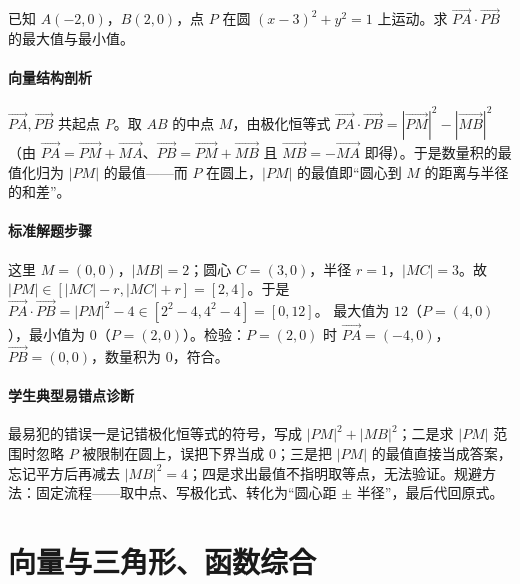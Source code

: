 \begin{problem}
已知 $A(-2,0)$，$B(2,0)$，点 $P$ 在圆 $(x-3)^2+y^2=1$ 上运动。求 $\overrightarrow{PA}\cdot\overrightarrow{PB}$ 的最大值与最小值。
\end{problem}
\begin{solution}
\paragraph{向量结构剖析}
$\overrightarrow{PA},\overrightarrow{PB}$ 共起点 $P$。取 $AB$ 的中点 $M$，由极化恒等式
$\overrightarrow{PA}\cdot\overrightarrow{PB}=|\overrightarrow{PM}|^2-|\overrightarrow{MB}|^2$
（由 $\overrightarrow{PA}=\overrightarrow{PM}+\overrightarrow{MA}$、$\overrightarrow{PB}=\overrightarrow{PM}+\overrightarrow{MB}$ 且 $\overrightarrow{MB}=-\overrightarrow{MA}$ 即得）。于是数量积的最值化归为 $|PM|$ 的最值——而 $P$ 在圆上，$|PM|$ 的最值即“圆心到 $M$ 的距离与半径的和差”。
\paragraph{标准解题步骤}
这里 $M=(0,0)$，$|MB|=2$；圆心 $C=(3,0)$，半径 $r=1$，$|MC|=3$。故 $|PM|\in[|MC|-r,|MC|+r]=[2,4]$。于是
$\overrightarrow{PA}\cdot\overrightarrow{PB}=|PM|^2-4\in[2^2-4,4^2-4]=[0,12]$。
最大值为 $12$（$P=(4,0)$），最小值为 $0$（$P=(2,0)$）。检验：$P=(2,0)$ 时 $\overrightarrow{PA}=(-4,0)$，$\overrightarrow{PB}=(0,0)$，数量积为 $0$，符合。
\paragraph{学生典型易错点诊断}
最易犯的错误一是记错极化恒等式的符号，写成 $|PM|^2+|MB|^2$；二是求 $|PM|$ 范围时忽略 $P$ 被限制在圆上，误把下界当成 $0$；三是把 $|PM|$ 的最值直接当成答案，忘记平方后再减去 $|MB|^2=4$；四是求出最值不指明取等点，无法验证。规避方法：固定流程——取中点、写极化式、转化为“圆心距 $\pm$ 半径”，最后代回原式。
\end{solution}

\section{向量与三角形、函数综合}

